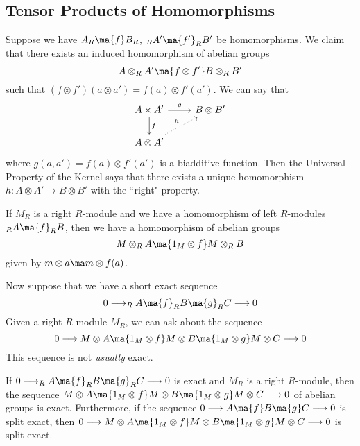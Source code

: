 \subsection{Tensor Products of Homomorphisms} 

Suppose we have $A_R \ma{f} B_R$, $_R A' \ma{f'} _R B'$ be homomorphisms. We claim that there exists an induced homomorphism of abelian groups
\[
A \otimes_R A' \ma{f \otimes f'} B \otimes_R B'
\]
such that $(f \otimes f')(a \otimes a')=f(a) \otimes f'(a')$. We can say that 
\[
\begin{tikzcd}
A \times A' \arrow{r}{g} \arrow{d}{f} & B \otimes B' \\
A \otimes A' \arrow[dotted]{ur}{h} & 
\end{tikzcd}
\]
where $g(a,a')=f(a) \otimes f'(a')$ is a biadditive function. Then the Universal Property of the Kernel says that there exists a unique homomorphism $h: A \otimes A' \longrightarrow B \otimes B'$ with the ``right" property. 

\begin{ex}
If $M_R$ is a right $R$-module and we have a homomorphism of left $R$-modules $_R A \ma{f} _R B$, then we have a homomorphism of abelian groups 
\[
M \otimes_R A \ma{1_M \otimes f} M \otimes_R B
\]
given by $m \otimes a \ma m \otimes f(a)$. 
\end{ex}

Now suppose that we have a short exact sequence
\[
0 \longrightarrow _R A \ma{f} _R B \ma{g} _R C \longrightarrow 0
\]
Given a right $R$-module $M_R$, we can ask about the sequence
\[
0 \longrightarrow M \otimes A \ma{1_M \otimes f} M \otimes B \ma{1_M \otimes g} M \otimes C \longrightarrow 0
\]
This sequence is not \emph{usually} exact. 

\begin{thm}
If $0 \longrightarrow _R A \ma{f} _R B \ma{g} _R C \longrightarrow 0$ is exact and $M_R$ is a right $R$-module, then the sequence $M \otimes A \ma{1_M \otimes f} M \otimes B \ma{1_M \otimes g} M \otimes C \longrightarrow 0$ of abelian groups is exact. Furthermore, if the sequence $0 \longrightarrow A \ma{f} B \ma{g} C \longrightarrow 0$ is split exact, then $0 \longrightarrow M \otimes A \ma{1_M \otimes f} M \otimes B \ma{1_M \otimes g} M \otimes C \longrightarrow 0$ is split exact. 
\end{thm}

